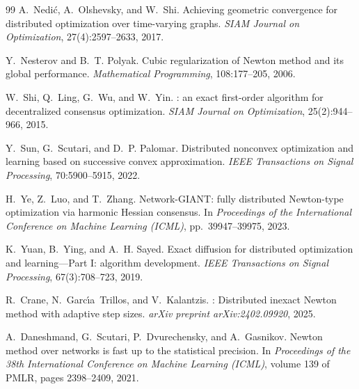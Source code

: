 \documentclass[review,onefignum,onetabnum]{siamart171218}
\begin{document}
\begin{thebibliography}{99}
		A.~Nedi{\'c}, A.~Olshevsky, and W.~Shi.
		\newblock Achieving geometric convergence for distributed optimization over time-varying graphs.
		\newblock \emph{SIAM Journal on Optimization}, 27(4):2597--2633, 2017.
		
		Y.~Nesterov and B.~T. Polyak.
		\newblock Cubic regularization of {N}ewton method and its global performance.
		\newblock \emph{Mathematical Programming}, 108:177--205, 2006.
		
		W.~Shi, Q.~Ling, G.~Wu, and W.~Yin.
		: an exact first-order algorithm for decentralized consensus optimization.
		\newblock \emph{SIAM Journal on Optimization}, 25(2):944--966, 2015.
		
		Y.~Sun, G.~Scutari, and D.~P. Palomar.
		\newblock Distributed nonconvex optimization and learning based on successive convex approximation.
		\newblock \emph{IEEE Transactions on Signal Processing}, 70:5900--5915, 2022.
		
		H.~Ye, Z.~Luo, and T.~Zhang.
		\newblock Network-{GIANT}: fully distributed {N}ewton-type optimization via harmonic Hessian consensus.
		\newblock In \emph{Proceedings of the International Conference on Machine Learning (ICML)}, pp.~39947--39975, 2023.
		
		K.~Yuan, B.~Ying, and A.~H. Sayed.
		\newblock Exact diffusion for distributed optimization and learning---Part {I}: algorithm development.
		\newblock \emph{IEEE Transactions on Signal Processing}, 67(3):708--723, 2019.
		
		
		R.~Crane, N.~Garc\'{\i}a~Trillos, and V.~Kalantzis.
		: Distributed inexact {N}ewton method with adaptive step sizes.
		\newblock \emph{arXiv preprint arXiv:2402.09920}, 2025.

		A.~Daneshmand, G.~Scutari, P.~Dvurechensky, and A.~Gasnikov.
		\newblock Newton method over networks is fast up to the statistical precision.
		\newblock In \emph{Proceedings of the 38th International Conference on Machine Learning (ICML)}, volume 139 of PMLR, pages 2398--2409, 2021.
		

\end{thebibliography}
\end{document}
